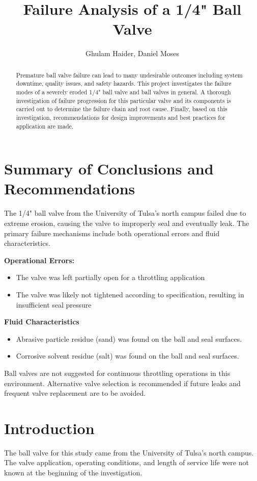 \documentclass[]{article}
\title{Failure Analysis of a 1/4" Ball Valve}
\author{Ghulam Haider, Daniel Moses}
\begin{document}
\maketitle

\begin{abstract}
	
	Premature ball valve failure can lead to many undesirable outcomes including system downtime, quality issues, and safety hazards. This project investigates the failure modes of a severely eroded 1/4" ball valve and ball valves in general. A thorough investigation of failure progression for this particular valve and its components is carried out to determine the failure chain and root cause. Finally, based on this investigation, recommendations for design improvements and best practices for application are made.
	

\end{abstract}
\tableofcontents
\pagebreak
\section{Summary of Conclusions and Recommendations}
The 1/4" ball valve from the University of Tulsa’s north campus failed due to extreme erosion, causing the valve to improperly seal and eventually leak. The primary failure mechanisms include both operational errors and fluid characteristics.

\textbf{Operational Errors:}
\begin{itemize}
	\item The valve was left partially open for a throttling application
	\item The valve was likely not tightened according to specification, resulting in insufficient seal pressure
\end{itemize}

\textbf{Fluid Characteristics}
\begin{itemize}
	\item Abrasive particle residue (sand) was found on the ball and seal surfaces. 
	\item Corrosive solvent residue (salt) was found on the ball and seal surfaces.
\end{itemize}

Ball valves are not suggested for continuous throttling operations in this environment. Alternative valve selection is recommended if future leaks and frequent valve replacement are to be avoided.

\section{Introduction}
The ball valve for this study came from the University of Tulsa's north campus. The valve application, operating conditions, and length of service life were not known at the beginning of the investigation. 
\end{document}
